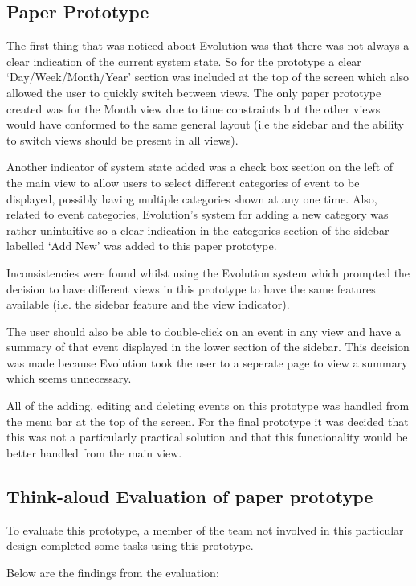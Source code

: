 \documentclass{article}
\begin{document}
\subsection{Paper Prototype}

The first thing that was noticed about Evolution was that there was not
always a clear indication of the current system state. So for the
prototype a clear `Day/Week/Month/Year' section was included at the
top of the screen which also allowed the user to quickly switch between
views. The only paper prototype created was for the Month view due
to time constraints but the other views would have conformed to the
same general layout (i.e the sidebar and the ability to switch views
should be present in all views).

Another indicator of system state added was a check box section on
the left of the main view to allow users to select different categories
of event to be displayed, possibly having multiple categories shown at
any one time. Also, related to event categories, Evolution's
system for adding a new category was rather unintuitive so a
clear indication in the categories section of the sidebar labelled
`Add New' was added to this paper prototype.

Inconsistencies were found whilst using the Evolution system which
prompted the decision to have different views in this prototype to
have the same features available (i.e. the sidebar feature and the view
indicator).

The user should also be able to double-click on an event in any view and
have a summary of that event displayed in the lower section of the
sidebar. This decision was made because Evolution took the user to a
seperate page to view a summary which seems unnecessary.

All of the adding, editing and deleting events on this prototype was 
handled from the menu bar at the top of the screen. For the final
prototype it was decided that this was not a particularly practical
solution and that this functionality would be better handled from the
main view.

\subsection{Think-aloud Evaluation of paper prototype}

To evaluate this prototype, a member of the team not involved in this
particular design completed some tasks using this prototype.

Below are the findings from the evaluation:
\end{document}
